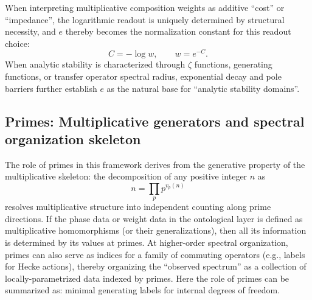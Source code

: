 When interpreting multiplicative composition weights as additive ``cost'' or ``impedance'', the logarithmic readout is uniquely determined by structural necessity, and $e$ thereby becomes the normalization constant for this readout choice:
\[
C=-\log w,\qquad w=e^{-C}.
\]
When analytic stability is characterized through $\zeta$ functions, generating functions, or transfer operator spectral radius, exponential decay and pole barriers further establish $e$ as the natural base for ``analytic stability domains''.

\subsection{Primes: Multiplicative generators and spectral organization skeleton}

The role of primes in this framework derives from the generative property of the multiplicative skeleton: the decomposition of any positive integer $n$ as
\[
n=\prod_{p} p^{v_p(n)}
\]
resolves multiplicative structure into independent counting along prime directions. If the phase data or weight data in the ontological layer is defined as multiplicative homomorphisms (or their generalizations), then all its information is determined by its values at primes.
At higher-order spectral organization, primes can also serve as indices for a family of commuting operators (e.g., labels for Hecke actions), thereby organizing the ``observed spectrum'' as a collection of locally-parametrized data indexed by primes. Here the role of primes can be summarized as: minimal generating labels for internal degrees of freedom.
